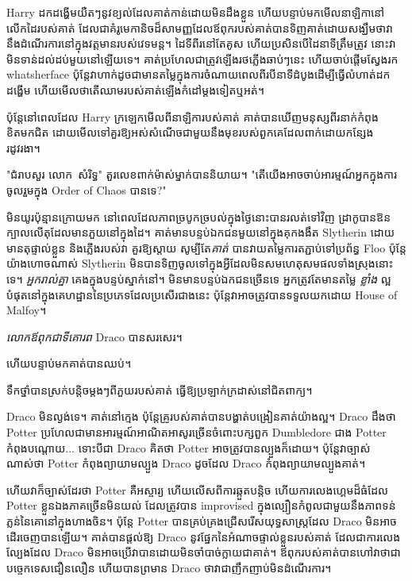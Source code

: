 Harry ដកដង្ហើមយឺតៗនូវខ្យល់ដែលគាត់កាន់ដោយមិនដឹងខ្លួន ហើយបន្ទាប់មកមើលនាឡិកានៅលើកដៃរបស់គាត់ ដែលជាគំរូមេកានិចដ៏សាមញ្ញដែលឪពុករបស់គាត់បានទិញគាត់ដោយសង្ឃឹមថាវានឹងដំណើរការនៅក្នុងវត្តមានរបស់វេទមន្ត។ ដៃទីពីរនៅតែគូស ហើយប្រសិនបើដៃនាទីត្រឹមត្រូវ នោះវាមិនទាន់ដល់ដប់មួយនៅឡើយទេ។ គាត់ប្រហែលជាត្រូវឡើងរថភ្លើងឆាប់ៗនេះ ហើយចាប់ផ្តើមស្វែងរក whatsherface ប៉ុន្តែវាហាក់ដូចជាមានតម្លៃក្នុងការចំណាយពេលពីរបីនាទីដំបូងដើម្បីធ្វើលំហាត់ដកដង្ហើម ហើយមើលថាតើឈាមរបស់គាត់ឡើងកំដៅម្តងទៀតឬអត់។

ប៉ុន្តែនៅពេលដែល Harry ក្រឡេកមើលពីនាឡិការបស់គាត់ គាត់បានឃើញមនុស្សពីរនាក់កំពុងខិតមកជិត ដោយមើលទៅគួរឱ្យអស់សំណើចជាមួយនឹងមុខរបស់ពួកគេដែលពាក់ដោយកន្សែងរដូវរងា។

"ជំរាបសួរ លោក~សំរិទ្ធ" តួរលេខពាក់ម៉ាស់ម្នាក់បាននិយាយ។ "តើយើងអាចចាប់អារម្មណ៍អ្នកក្នុងការចូលរួមក្នុង Order of Chaos បានទេ?"


មិនយូរប៉ុន្មានក្រោយមក នៅពេលដែលភាពច្របូកច្របល់ក្នុងថ្ងៃនោះបានរលត់ទៅវិញ ដ្រាកូបានឱនក្បាលលើតុដែលមានភួយនៅក្នុងដៃ។ គាត់មានបន្ទប់ឯកជនមួយនៅក្នុងគុកងងឹត Slytherin ដោយមានតុផ្ទាល់ខ្លួន និងភ្លើងរបស់វា គួរឱ្យស្តាយ សូម្បីតែ\emph{គាត់} បានវាយតម្លៃការតភ្ជាប់ទៅប្រព័ន្ធ Floo ប៉ុន្តែយ៉ាងហោចណាស់ Slytherin មិនបានទិញចូលទៅក្នុងអ្វីដែលមិនសមហេតុសមផលទាំងស្រុងនោះទេ។ \emph{អ្នករាល់គ្នា} គេងក្នុងបន្ទប់ស្នាក់នៅ។ មិនមានបន្ទប់ឯកជនច្រើនទេ អ្នកត្រូវតែមានតម្លៃ \emph{ខ្លាំង} ល្អបំផុតនៅក្នុងគេហដ្ឋាននៃប្រភេទដែលប្រសើរជាងនេះ ប៉ុន្តែវាអាចត្រូវបានទទួលយកដោយ House of Malfoy។

\emph{លោកឪពុកជាទីគោរព} Draco បានសរសេរ។

ហើយបន្ទាប់មកគាត់បានឈប់។

ទឹកថ្នាំបានស្រក់បន្តិចម្តងៗពីភួយរបស់គាត់ ធ្វើឱ្យប្រឡាក់ក្រដាស់នៅជិតពាក្យ។

Draco មិនល្ងង់ទេ។ គាត់នៅក្មេង ប៉ុន្តែគ្រូរបស់គាត់បានបង្ហាត់បង្រៀនគាត់យ៉ាងល្អ។ Draco ដឹងថា Potter ប្រហែលជាមានអារម្មណ៍អាណិតអាសូរច្រើនចំពោះបក្សពួក Dumbledore ជាង Potter កំពុងបណ្តោយ... ទោះបីជា Draco គិតថា Potter អាចត្រូវបានល្បួងក៏ដោយ។ ប៉ុន្តែវាច្បាស់ណាស់ថា Potter កំពុងព្យាយាមល្បួង Draco ដូចដែល Draco កំពុងព្យាយាមល្បួងគាត់។

ហើយវាក៏ច្បាស់ដែរថា Potter គឺអស្ចារ្យ ហើយលើសពីការឆ្កួតបន្តិច ហើយការលេងហ្គេមដ៏ធំដែល Potter ខ្លួនឯងភាគច្រើនមិនយល់ ដែលត្រូវបាន improvised ក្នុងល្បឿនកំពូលជាមួយនឹងភាពទន់ភ្លន់នៃគោនៅក្នុងហាងចិន។ ប៉ុន្តែ Potter បាន​គ្រប់គ្រង​ជ្រើសរើស​យុទ្ធសាស្ត្រ​ដែល Draco មិន​អាច​ដើរ​ចេញ​បាន​ឡើយ។ គាត់បានផ្តល់ឱ្យ Draco នូវផ្នែកនៃអំណាចផ្ទាល់ខ្លួនរបស់គាត់ ដែលជាការលេងល្បែងដែល Draco មិនអាចប្រើវាបានដោយមិនចាំបាច់ក្លាយជាគាត់។ ឪពុក​របស់​គាត់​បាន​ហៅ​វា​ថា​ជា​បច្ចេកទេស​ជឿនលឿន ហើយ​បាន​ព្រមាន Draco ថា​វា​ជា​ញឹកញាប់​មិន​ដំណើរការ។


